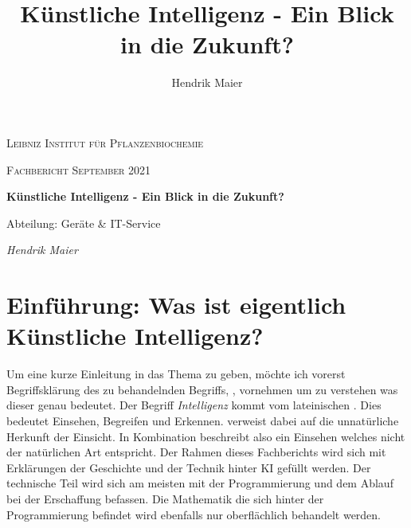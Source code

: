 \documentclass[12pt]{report}
\title{Künstliche Intelligenz - Ein Blick in die Zukunft?}
\author{Hendrik Maier}
\date{}
\begin{document}
    \begin{titlepage}
        \centering
        {\scshape\LARGE Leibniz Institut für Pflanzenbiochemie\par}
        \vspace{1cm}
        {\scshape\Large Fachbericht September 2021\par}
        \vspace{1.5cm}
        {\huge\bfseries Künstliche Intelligenz - Ein Blick in die Zukunft?\par}
        \vspace{2cm}
        {\Large Abteilung: Geräte \& IT-Service\par}
        \vspace{1.5cm}
        {\Large\itshape Hendrik Maier\par}
        \vfill

    \end{titlepage}

    \tableofcontents
    \newpage

    \section{Einführung: Was ist eigentlich Künstliche Intelligenz?}
    Um eine kurze Einleitung in das Thema zu geben, möchte ich vorerst Begriffsklärung des zu behandelnden Begriffs,
    , vornehmen um zu verstehen was dieser genau bedeutet.
    Der Begriff \emph{Intelligenz} kommt vom lateinischen . Dies bedeutet Einsehen, Begreifen und Erkennen.\cite{piaget2000psychologie}
     verweist dabei auf die unnatürliche Herkunft der Einsicht. In Kombination beschreibt 
    also ein Einsehen welches nicht der natürlichen Art entspricht. Der Rahmen dieses Fachberichts wird sich mit Erklärungen
    der Geschichte und der Technik hinter KI gefüllt werden. Der technische Teil wird sich am meisten
    mit der Programmierung und dem Ablauf bei der Erschaffung befassen. Die Mathematik die sich hinter
    der Programmierung befindet wird ebenfalls nur oberflächlich behandelt werden.
    
\end{document}
